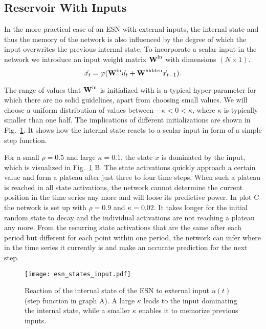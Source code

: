 \subsection{Reservoir With Inputs}
\label{sub:reservoir_without_feedback_weights}

In the more practical case of an ESN with external inputs, the internal state
and thus the memory of the network is also influenced by the degree of which
the input overwrites the previous internal state.  To incorporate a scalar
input in the network we introduce an input weight matrix $\boldsymbol{\textbf{W}}^{\text{in}}$ with
dimensions $(N \times 1)$.
\begin{equation}
  \label{eq:state_space_no_feedback}
  \vec{x}_t = \varphi(\boldsymbol{\textbf{W}}^{\text{in}}  \vec{u}_t + \boldsymbol{\textbf{W}}^{\text{hidden}} \vec{x}_{t-1}).
\end{equation}

The range of values that $\boldsymbol{\textbf{W}}^{\text{in}}$ is initialized with is a typical
hyper-parameter for which there are no solid guidelines, apart from choosing
small values.  We will choose a uniform distribution of values between $-\kappa
< 0 < \kappa$, where $\kappa$ is typically smaller than one half. The
implications of different initializations are shown in
Fig.~\ref{fig:esn_states_input}.  It shows how the internal state reacts to a
scalar input in form of a simple step function. 

For a small $\rho=0.5$ and large $\kappa=0.1$, the state $x$ is dominated by
the input, which is visualized in Fig.~\ref{fig:esn_states_input} B.  The state
activations quickly approach a certain value and form a plateau after just three
to four time steps. When such a plateau is reached in all state activations,
the network cannot determine the current position in the time series any more
and will loose its predictive power.  In plot C the network is set up with
$\rho=0.9$ and $\kappa=0.02$.  It takes longer for the initial random state to
decay and the individual activations are not reaching a plateau any more.  From
the recurring state activations that are the same after each period but
different for each point within one period, the network can infer where in the
time series it currently is and make an accurate prediction for the next step.
\begin{figure}
  \centering
  \texttt{[image: esn\_states\_input.pdf]}
  \caption{Reaction of the internal state of the ESN to external input $u(t)$
  (step function in graph A).
  A large $\kappa$ leads to the input dominating the internal state, while a
  smaller $\kappa$ enables it to memorize previous inputs.}
  \label{fig:esn_states_input}
\end{figure}

